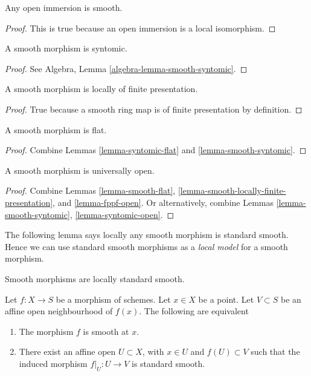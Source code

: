 \begin{lemma}
\label{lemma-open-immersion-smooth}
Any open immersion is smooth.
\end{lemma}

\begin{proof}
This is true because an open immersion is a local isomorphism.
\end{proof}

\begin{lemma}
\label{lemma-smooth-syntomic}
A smooth morphism is syntomic.
\end{lemma}

\begin{proof}
See Algebra, Lemma \ref{algebra-lemma-smooth-syntomic}.
\end{proof}

\begin{lemma}
\label{lemma-smooth-locally-finite-presentation}
A smooth morphism is locally of finite presentation.
\end{lemma}

\begin{proof}
True because a smooth ring map is of finite presentation by
definition.
\end{proof}

\begin{lemma}
\label{lemma-smooth-flat}
A smooth morphism is flat.
\end{lemma}

\begin{proof}
Combine Lemmas \ref{lemma-syntomic-flat} and \ref{lemma-smooth-syntomic}.
\end{proof}

\begin{lemma}
\label{lemma-smooth-open}
A smooth morphism is universally open.
\end{lemma}

\begin{proof}
Combine
Lemmas \ref{lemma-smooth-flat},
\ref{lemma-smooth-locally-finite-presentation}, and
\ref{lemma-fppf-open}.
Or alternatively, combine
Lemmas \ref{lemma-smooth-syntomic},
\ref{lemma-syntomic-open}.
\end{proof}

\noindent
The following lemma says locally any smooth morphism is standard smooth.
Hence we can use standard smooth morphisms as a {\it local model}
for a smooth morphism.

\begin{lemma}
\label{lemma-smooth-locally-standard-smooth}
\begin{slogan}
Smooth morphisms are locally standard smooth.
\end{slogan}
Let $f : X  \to S$ be a morphism of schemes.
Let $x \in X$ be a point.
Let $V \subset S$ be an affine open neighbourhood of $f(x)$.
The following are equivalent
\begin{enumerate}
\item The morphism $f$ is smooth at $x$.
\item There exist an affine open $U \subset X$,
with $x \in U$ and $f(U) \subset V$ such that the
induced morphism $f|_U : U \to V$ is standard smooth.
\end{enumerate}
\end{lemma}

